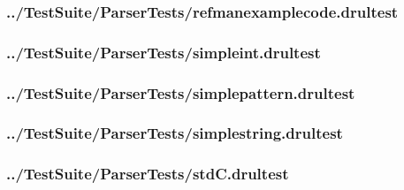 \begin{changemargin}{-1in}{-1in}
\subsubsection{../TestSuite/ParserTests/refmanexamplecode.drultest}


\subsubsection{../TestSuite/ParserTests/simpleint.drultest}


\subsubsection{../TestSuite/ParserTests/simplepattern.drultest}


\subsubsection{../TestSuite/ParserTests/simplestring.drultest}


\subsubsection{../TestSuite/ParserTests/stdC.drultest}



\end{changemargin}



